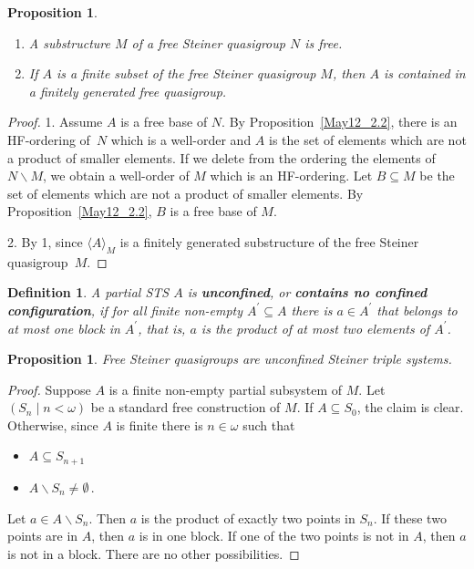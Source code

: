 \documentclass[a4paper, 11pt]{article}
\theoremstyle{note}
\newtheorem{df}[thm]{Definition}
\newtheorem{prop}[thm]{Proposition}
\begin{document}
	\begin{prop} \label{freesubs} 
	\begin{enumerate}	
		\item A substructure $M$ of a free Steiner quasigroup $N$ is free. 
		\item If $A$ is a finite subset of the free Steiner quasigroup $M$, then $A$ is contained in a finitely generated free quasigroup.
		\end{enumerate}
	\end{prop}
	\begin{proof}  1. Assume $A$ is a free base of $N$.  By Proposition~\ref{May12_2.2}, there is an HF-ordering of~$N$ which is a well-order and $A$ is the set of elements which are not a product of smaller elements. If we delete from the ordering the elements of $N\smallsetminus M$, we obtain a well-order of $M$ which is an HF-ordering. Let $B\subseteq M$ be the set of elements which are not a product of smaller elements. By Proposition~\ref{May12_2.2}, $B$ is a free base of $M$.
		
			2. By 1, since $\langle A\rangle_M$ is a finitely generated substructure of the free Steiner quasigroup~$M$.
		\end{proof}
	
	
	\begin{df} A partial  STS $A$ is \textbf{unconfined}, or \textbf{contains no confined configuration}, if for all finite non-empty $A^\prime \subseteq A$ there is $a \in A^\prime$ that belongs to at most one block in $A^\prime$, that is, $a$ is the product of at most two elements of $A^\prime$.
		
	\end{df}
	
	\begin{prop}\label{2024_nov1} 
	 Free Steiner quasigroups are unconfined Steiner triple systems.
			\end{prop}
	\begin{proof}
	Suppose $A$ is a finite non-empty partial subsystem of $M$. Let $(S_n \mid n < \omega)$ be a standard free construction of $M$. If $A \subseteq S_0$, the claim is clear. Otherwise, since $A$ is finite there is $n \in \omega$ such that 
			\begin{itemize}
				\item $A \subseteq S_{n+1}$
				\item $A \smallsetminus S_n \neq \emptyset$\,.
			\end{itemize}
			Let $a \in A \smallsetminus S_{n}$. Then $a$ is the product of exactly two points in $S_n$. If these two points are in $A$, then $a$ is in one block.  If one of the two points is not in $A$, then $a$ is not in a block. There are no other possibilities.
				\end{proof}
				
\end{document}

